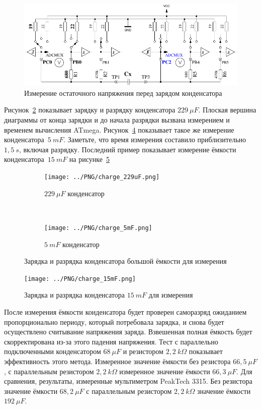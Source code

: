 \begin{figure}[H]
\centering
\includegraphics[width=.8\textwidth]{../FIG/Cap_residV.pdf}
\caption{Измерение остаточного напряжения перед зарядом конденсатора}
\label{fig:CapResidV}
\end{figure}

Рисунок~\ref{pic:c229} показывает зарядку и разрядку конденсатора \(229~\mu F\).
Плоская вершина диаграммы от конца зарядки и до начала разрядки вызвана измерением и временем вычисления ATmega. 
Рисунок~\ref{pic:c5mF} показывает такое же измерение конденсатора~\(5~mF\).
Заметьте, что время измерения составило приблизительно \(1,5~s\), включая разрядку.
Последний пример показывает измерение ёмкости конденсатора~\(15~mF\) на рисунке~\ref{pic:c15mF}

\begin{figure}[H]
  \begin{subfigure}[b]{.5\textwidth}
    \centering
    \texttt{[image: ../PNG/charge\_229uF.png]}
    \caption{\(229~\mu F\) конденсатор}
    \label{pic:c229}
  \end{subfigure}
  ~
  \begin{subfigure}[b]{.5\textwidth}
    \centering
    \texttt{[image: ../PNG/charge\_5mF.png]}
    \caption{\(5~mF\) конденсатор}
    \label{pic:c5mF}
  \end{subfigure}
  \caption{Зарядка и разрядка конденсатора большой ёмкости для измерения}
\end{figure}

\begin{figure}[H]
  \centering
    \texttt{[image: ../PNG/charge\_15mF.png]}
  \caption{Зарядка и разрядка конденсатора \(15~mF\) для измерения}
  \label{pic:c15mF}
\end{figure}

После измерения ёмкости конденсатора будет проверен саморазряд ожиданием пропорционально периоду, который 
потребовала зарядка, и снова будет осуществлено считывание напряжения заряда. Взвешенная полная ёмкость будет 
скорректирована из-за этого падения напряжения. Тест с параллельно подключенными конденсатором \(68~\mu F\) и 
резистором \(2,2~k\Omega\) показывает эффективность этого метода. Измеренное  значение ёмкости без 
резистора \(66,5~\mu F\), с параллельным резистором \(2,2~k\Omega\) измеренное значение ёмкости \(66,3~\mu F\).
Для сравнения, результаты, измеренные мультиметром  PeakTech 3315. Без резистора значение ёмкости \(68,2~\mu F\) с 
параллельным резистором \(2,2~k\Omega\) значение ёмкости \(192~\mu F\).


